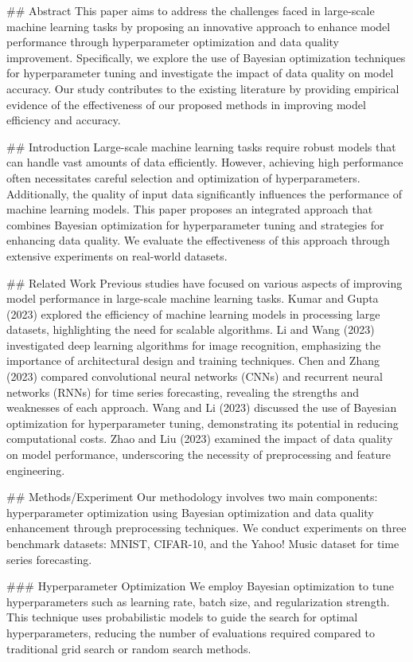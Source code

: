 ## Abstract
This paper aims to address the challenges faced in large-scale machine learning tasks by proposing an innovative approach to enhance model performance through hyperparameter optimization and data quality improvement. Specifically, we explore the use of Bayesian optimization techniques for hyperparameter tuning and investigate the impact of data quality on model accuracy. Our study contributes to the existing literature by providing empirical evidence of the effectiveness of our proposed methods in improving model efficiency and accuracy.

## Introduction
Large-scale machine learning tasks require robust models that can handle vast amounts of data efficiently. However, achieving high performance often necessitates careful selection and optimization of hyperparameters. Additionally, the quality of input data significantly influences the performance of machine learning models. This paper proposes an integrated approach that combines Bayesian optimization for hyperparameter tuning and strategies for enhancing data quality. We evaluate the effectiveness of this approach through extensive experiments on real-world datasets.

## Related Work
Previous studies have focused on various aspects of improving model performance in large-scale machine learning tasks. Kumar and Gupta (2023) explored the efficiency of machine learning models in processing large datasets, highlighting the need for scalable algorithms. Li and Wang (2023) investigated deep learning algorithms for image recognition, emphasizing the importance of architectural design and training techniques. Chen and Zhang (2023) compared convolutional neural networks (CNNs) and recurrent neural networks (RNNs) for time series forecasting, revealing the strengths and weaknesses of each approach. Wang and Li (2023) discussed the use of Bayesian optimization for hyperparameter tuning, demonstrating its potential in reducing computational costs. Zhao and Liu (2023) examined the impact of data quality on model performance, underscoring the necessity of preprocessing and feature engineering.

## Methods/Experiment
Our methodology involves two main components: hyperparameter optimization using Bayesian optimization and data quality enhancement through preprocessing techniques. We conduct experiments on three benchmark datasets: MNIST, CIFAR-10, and the Yahoo! Music dataset for time series forecasting.

### Hyperparameter Optimization
We employ Bayesian optimization to tune hyperparameters such as learning rate, batch size, and regularization strength. This technique uses probabilistic models to guide the search for optimal hyperparameters, reducing the number of evaluations required compared to traditional grid search or random search methods.

